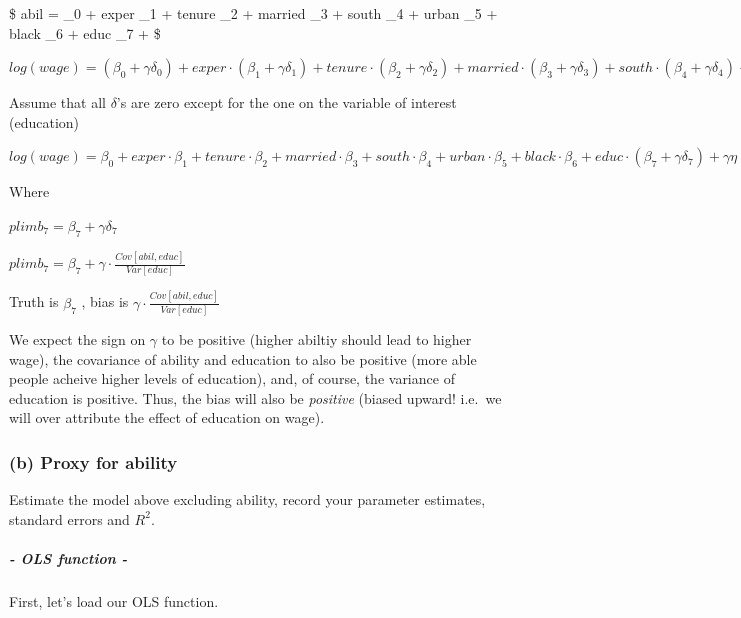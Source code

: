 \documentclass[11pt,]{article}
\let\oldsubparagraph\subparagraph
\renewcommand{\subparagraph}[1]{\oldsubparagraph{#1}\mbox{}}
\begin{document}
\$ abil = \delta\_0 + exper \cdot \delta\_1 + tenure \cdot \delta\_2 +
married \cdot \delta\_3 + south \cdot \delta\_4 + urban \cdot \delta\_5
+ black \cdot \delta\_6 + educ \cdot \delta\_7 + \eta\$

\(log(wage) = (\beta_0 + \gamma \delta_0) + exper \cdot (\beta_1 + \gamma \delta_1) + tenure \cdot (\beta_2 + \gamma \delta_2) + married \cdot (\beta_3 + \gamma \delta_3) + south \cdot (\beta_4 + \gamma \delta_4) + urban \cdot (\beta_5 + \gamma \delta_5) + black \cdot (\beta_6 + \gamma \delta_6) + educ \cdot (\beta_7 + \gamma \delta_7) + \gamma \eta + v\)

Assume that all \(\delta\)'s are zero except for the one on the variable
of interest (education)

\(log(wage) = \beta_0 + exper \cdot \beta_1 + tenure \cdot \beta_2 + married \cdot \beta_3 + south \cdot \beta_4 + urban \cdot \beta_5 + black \cdot \beta_6 + educ \cdot (\beta_7 + \gamma \delta_7) + \gamma \eta + v\)

Where

\(plim b_7 = \beta_7 + \gamma \delta_7\)

\(plim b_7 = \beta_7 + \gamma \cdot \frac {Cov [ abil , educ ]} {Var [educ]}\)

Truth is \(\beta_7\) , bias is
\(\gamma \cdot \frac {Cov [ abil , educ ]} {Var [educ]}\)

We expect the sign on \(\gamma\) to be positive (higher abiltiy should
lead to higher wage), the covariance of ability and education to also be
positive (more able people acheive higher levels of education), and, of
course, the variance of education is positive. Thus, the bias will also
be \emph{positive} (biased upward! i.e.~we will over attribute the
effect of education on wage).

\subsubsection{(b) Proxy for ability}\label{b-proxy-for-ability}

Estimate the model above excluding ability, record your parameter
estimates, standard errors and \(R^2\).

\subparagraph{- OLS function -}\label{ols-function--}

First, let's load our OLS function.
\end{document}
